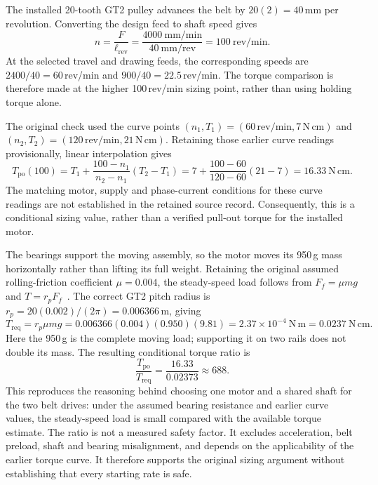 The installed 20-tooth GT2 pulley advances the belt by $20(2)=40$\,mm per revolution. Converting the design feed to shaft speed gives~\cite{acarnley2002}
\begin{equation}
n=\frac{F}{\ell_{\mathrm{rev}}}
=\frac{4000\ \mathrm{mm/min}}{40\ \mathrm{mm/rev}}
=100\ \mathrm{rev/min}.
\label{eq:gan-rpm}
\end{equation}
At the selected travel and drawing feeds, the corresponding speeds are $2400/40=60$\,rev/min and $900/40=22.5$\,rev/min. The torque comparison is therefore made at the higher 100\,rev/min sizing point, rather than using holding torque alone.

The original check used the curve points $(n_1,T_1)=(60\,\mathrm{rev/min},7\,\mathrm{N\,cm})$ and $(n_2,T_2)=(120\,\mathrm{rev/min},21\,\mathrm{N\,cm})$. Retaining those earlier curve readings provisionally, linear interpolation gives
\begin{equation}
T_{\mathrm{po}}(100)=T_1+\frac{100-n_1}{n_2-n_1}(T_2-T_1)
=7+\frac{100-60}{120-60}(21-7)
=16.33\ \mathrm{N\,cm}.
\label{eq:gan-pullout}
\end{equation}
The matching motor, supply and phase-current conditions for these curve readings are not established in the retained source record. Consequently, this is a conditional sizing value, rather than a verified pull-out torque for the installed motor.

The bearings support the moving assembly, so the motor moves its 950\,g mass horizontally rather than lifting its full weight. Retaining the original assumed rolling-friction coefficient $\mu=0.004$, the steady-speed load follows from $F_f=\mu mg$ and $T=r_pF_f$~\cite{acarnley2002}. The correct GT2 pitch radius is $r_p=20(0.002)/(2\pi)=0.006366$\,m, giving
\begin{equation}
T_{\mathrm{req}}=r_p\mu mg
=0.006366(0.004)(0.950)(9.81)
=2.37\times10^{-4}\ \mathrm{N\,m}
=0.0237\ \mathrm{N\,cm}.
\label{eq:des-torque}
\label{eq:gan-treq}
\end{equation}
Here the 950\,g is the complete moving load; supporting it on two rails does not double its mass. The resulting conditional torque ratio is
\begin{equation}
\frac{T_{\mathrm{po}}}{T_{\mathrm{req}}}
=\frac{16.33}{0.02373}\approx688.
\label{eq:gan-margin}
\end{equation}
This reproduces the reasoning behind choosing one motor and a shared shaft for the two belt drives: under the assumed bearing resistance and earlier curve values, the steady-speed load is small compared with the available torque estimate. The ratio is not a measured safety factor. It excludes acceleration, belt preload, shaft and bearing misalignment, and depends on the applicability of the earlier torque curve. It therefore supports the original sizing argument without establishing that every starting rate is safe.

